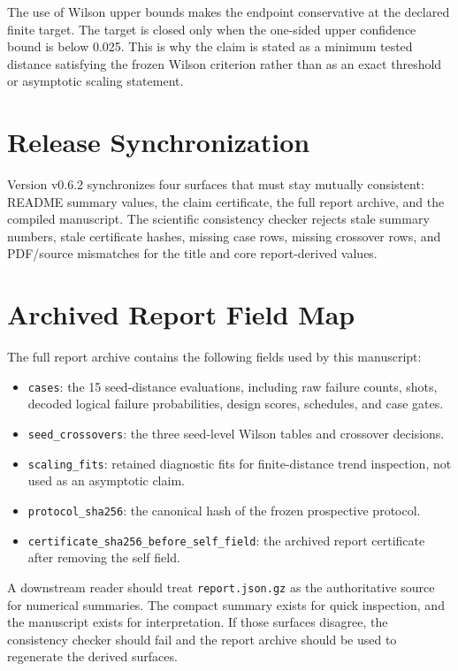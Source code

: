 \documentclass[11pt]{article}
\begin{document}
The use of Wilson upper bounds makes the endpoint conservative at the declared
finite target. The target is closed only when the one-sided upper confidence
bound is below 0.025. This is why the claim is stated as a minimum tested
distance satisfying the frozen Wilson criterion rather than as an exact
threshold or asymptotic scaling statement.

\section{Release Synchronization}
Version v0.6.2 synchronizes four surfaces that must stay mutually consistent:
README summary values, the claim certificate, the full report archive, and the
compiled manuscript. The scientific consistency checker rejects stale summary
numbers, stale certificate hashes, missing case rows, missing crossover rows,
and PDF/source mismatches for the title and core report-derived values.


\clearpage
\section{Archived Report Field Map}
The full report archive contains the following fields used by this manuscript:
\begin{itemize}
\item \texttt{cases}: the 15 seed-distance evaluations, including raw failure counts, shots, decoded logical failure probabilities, design scores, schedules, and case gates.
\item \texttt{seed\_crossovers}: the three seed-level Wilson tables and crossover decisions.
\item \texttt{scaling\_fits}: retained diagnostic fits for finite-distance trend inspection, not used as an asymptotic claim.
\item \texttt{protocol\_sha256}: the canonical hash of the frozen prospective protocol.
\item \texttt{certificate\_sha256\_before\_self\_field}: the archived report certificate after removing the self field.
\end{itemize}

A downstream reader should treat \texttt{report.json.gz} as the authoritative
source for numerical summaries. The compact summary exists for quick inspection,
and the manuscript exists for interpretation. If those surfaces disagree, the
consistency checker should fail and the report archive should be used to
regenerate the derived surfaces.
\end{document}
